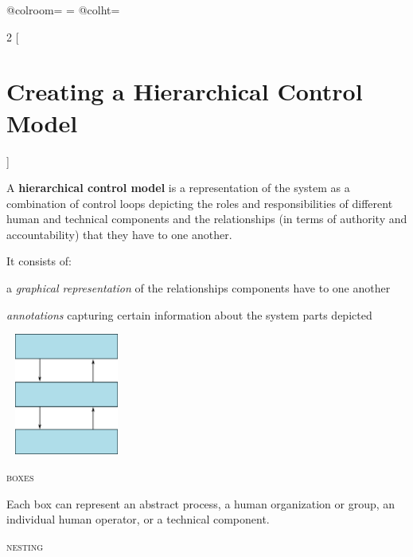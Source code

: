 \documentclass[letterpaper]{tufte-book}
\begin{document}
\begin{landscape}
\advance{}
\csname @colroom\endcsname=\vsize
\textheight=\vsize
\csname @colht\endcsname=\vsize

\setlength{\parindent}{0em}
\setlength{\parskip}{.75em}

\begin{multicols}{2}
[ \section{Creating a Hierarchical Control Model}]


A \textbf{hierarchical control model} is a representation of the system as a combination of control loops depicting the roles and responsibilities of different human and technical components and the relationships (in terms of authority and accountability) that they have to one another.

It consists of:
\begin{compactitem}
\setlength{\itemsep}{0pt}
\setlength{\parskip}{.25em}
\item a \emph{graphical representation} of the relationships components have to one another
%
\item \emph{annotations} capturing certain information about the system parts depicted
\end{compactitem}

\begin{center}
\includegraphics[width=4cm, height=4cm]{generic_model}
\end{center}


\begin{compactitem}
 \setlength{\itemsep}{0pt}
\setlength{\parskip}{.25em}
 \item \textsc{boxes}
 
 Each box can represent an abstract process, a human organization or group, an individual human operator, or a technical component.
 \item \textsc{nesting}
 

\end{compactitem}
\end{multicols}
\end{landscape}
\end{document}
